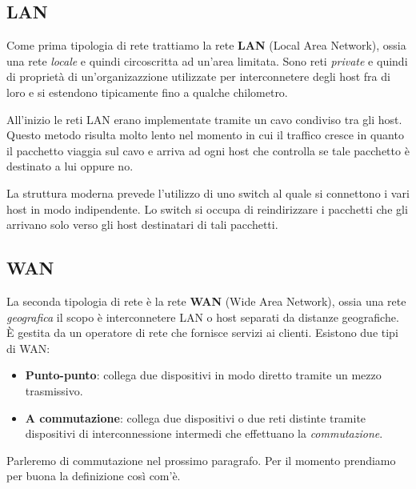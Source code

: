 \subsection{LAN}
Come prima tipologia di rete trattiamo la rete \textbf{LAN} (Local
Area Network), ossia una rete \emph{locale} e quindi circoscritta ad
un'area limitata. Sono reti \emph{private} e quindi di proprietà di 
un'organizazzione utilizzate per interconnetere degli host fra di loro 
e si estendono tipicamente fino a qualche chilometro.

All'inizio le reti LAN erano implementate tramite un cavo condiviso
tra gli host. Questo metodo risulta molto lento nel momento in cui il
traffico cresce in quanto il pacchetto viaggia sul cavo e arriva ad
ogni host che controlla se tale pacchetto è destinato a lui oppure no.

La struttura moderna prevede l'utilizzo di uno switch al quale si 
connettono i vari host in modo indipendente. Lo switch si occupa di
reindirizzare i pacchetti che gli arrivano solo verso gli host
destinatari di tali pacchetti.

\subsection{WAN}
La seconda tipologia di rete è la rete \textbf{WAN} (Wide Area 
Network), ossia una rete \emph{geografica} il scopo è interconnetere
LAN o host separati da distanze geografiche. \`E gestita da un 
operatore di rete che fornisce servizi ai clienti. Esistono due tipi 
di WAN:
\begin{itemize}
	\item \textbf{Punto-punto}: collega due dispositivi in modo
		diretto tramite un mezzo trasmissivo.
	\item \textbf{A commutazione}: collega due dispositivi o due reti
		distinte tramite dispositivi di interconnessione intermedi che
		effettuano la \emph{commutazione}.
\end{itemize}
Parleremo di commutazione nel prossimo paragrafo. Per il momento
prendiamo per buona la definizione così com'è.

